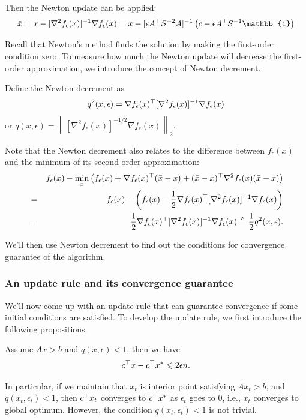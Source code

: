 Then the Newton update can be applied:
\begin{equation}
\bar{x}=x-[\nabla^2f_\epsilon(x)]^{-1}\nabla f_\epsilon(x)=x-[\epsilon A^\trans S^{-2}A]^{-1}\left(c-\epsilon A^\trans S^{-1}\mathbb{1}\right)\label{eq:Newton_update}
\end{equation}

Recall that Newton's method finds the solution by making the first-order condition zero. To measure how much the Newton update will decrease the first-order approximation, we introduce the concept of Newton decrement.

Define the Newton decrement as
\begin{equation}
q^2(x, \epsilon) = \nabla f_\epsilon(x)^\top[\nabla^2f_\epsilon(x)]^{-1}\nabla f_\epsilon(x)\label{eq:newton_decrement}
\end{equation}
or $q(x, \epsilon) = \left\|[\nabla^2f_\epsilon(x)]^{-1/2}\nabla f_\epsilon(x)\right\|_2$. 

Note that the Newton decrement also relates to the difference between $f_\epsilon(x)$ and the minimum of its second-order approximation:
\begin{eqnarray}
&&f_\epsilon(x)-\min_{\bar{x}}\left(f_\epsilon(x)+\nabla f_\epsilon(x)^\top(\bar{x}-x)+(\bar{x}-x)^\top\nabla^2 f_\epsilon(x)(\bar{x}-x)\right)\nonumber\\
&=&f_\epsilon(x)-\left(f_\epsilon(x)-\dfrac{1}{2}\nabla f_\epsilon(x)^\top[\nabla^2f_\epsilon(x)]^{-1}\nabla f_\epsilon(x)\right)\nonumber\\
&=&\dfrac{1}{2}\nabla f_\epsilon(x)^\top[\nabla^2f_\epsilon(x)]^{-1}\nabla f_\epsilon(x)\triangleq \dfrac{1}{2}q^2(x, \epsilon).
\end{eqnarray}

We'll then use Newton decrement to find out the conditions for convergence
guarantee of the algorithm. 

\subsubsection{An update rule and its convergence guarantee}
We'll now come up with an update rule that can guarantee convergence if some initial conditions are satisfied. To develop the update rule, we first introduce the following propositions. 
\begin{proposition}\label{prop1}
Assume $Ax > b$ and $q(x, \epsilon)<1$, then we have
\begin{align}
c^\top x-c^\top x^{*}\leqslant 2\epsilon n.
\end{align}
\end{proposition}
In particular, if we maintain that $x_t$ is interior point satisfying $Ax_t>b$,
and $q(x_t, \epsilon_t) < 1$, then $c^\top x_t$ converges to $c^\top x^*$ as $\epsilon_t$ goes to $0$, i.e., $x_t$ converges to global optimum. However, the condition $q(x_t,\epsilon_t)<1$ is not trivial.  

